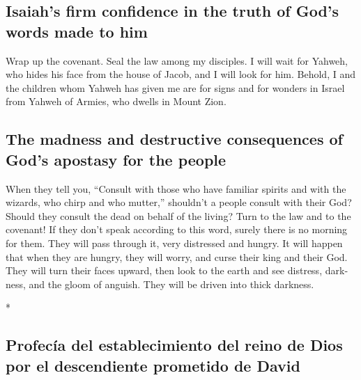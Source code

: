 \begin{paracol}{2}
\begin{otherlanguage}{english}
\hypertarget{isaiahs-firm-confidence-in-the-truth-of-gods-words-made-to-him}{%
\subsection{Isaiah's firm confidence in the truth of God's words made to
him}\label{isaiahs-firm-confidence-in-the-truth-of-gods-words-made-to-him}}

 Wrap up the covenant. Seal the law among my disciples.
 I will wait for Yahweh, who hides his face from the
house of Jacob, and I will look for him.  Behold, I and
the children whom Yahweh has given me are for signs and for wonders in
Israel from Yahweh of Armies, who dwells in Mount Zion.

\hypertarget{the-madness-and-destructive-consequences-of-gods-apostasy-for-the-people}{%
\subsection{The madness and destructive consequences of God's apostasy
for the
people}\label{the-madness-and-destructive-consequences-of-gods-apostasy-for-the-people}}

 When they tell you, ``Consult with those who have
familiar spirits and with the wizards, who chirp and who mutter,''
shouldn't a people consult with their God? Should they consult the dead
on behalf of the living?  Turn to the law and to the
covenant! If they don't speak according to this word, surely there is no
morning for them.  They will pass through it, very
distressed and hungry. It will happen that when they are hungry, they
will worry, and curse their king and their God. They will turn their
faces upward,  then look to the earth and see distress,
darkness, and the gloom of anguish. They will be driven into thick
darkness.

\end{otherlanguage}

\switchcolumn[0]*

\hypertarget{profecuxeda-del-establecimiento-del-reino-de-dios-por-el-descendiente-prometido-de-david}{%
\subsection{Profecía del establecimiento del reino de Dios por el
descendiente prometido de
David}\label{profecuxeda-del-establecimiento-del-reino-de-dios-por-el-descendiente-prometido-de-david}}


\end{paracol}
